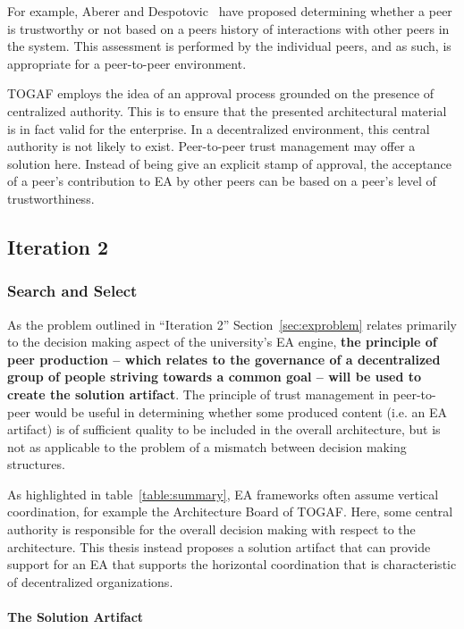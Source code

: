 For example, Aberer and Despotovic~\cite{aberer2001managing} have proposed determining whether a peer is trustworthy or not based on a peers history of interactions with other peers in the system. This assessment is performed by the individual peers, and as such, is appropriate for a peer-to-peer environment.

TOGAF employs the idea of an approval process grounded on the presence of centralized authority. This is to ensure that the presented architectural material is in fact valid for the enterprise. In a decentralized environment, this central authority is not likely to exist. Peer-to-peer trust management may offer a solution here. Instead of being give an explicit stamp of approval, the acceptance of a peer's contribution to EA by other peers can be based on a peer's level of trustworthiness. 

\subsection{Iteration 2}
\label{sec:design_iteration2}

\subsubsection*{Search and Select}

As the problem outlined in ``Iteration 2'' Section~\ref{sec:exproblem} relates primarily to the decision making aspect of the university's EA engine, \textbf{the principle of peer production -- which relates to the governance of a decentralized group of people striving towards a common goal -- will be used to create the solution artifact}.  The principle of trust management in peer-to-peer would be useful in determining whether some produced content (i.e. an EA artifact) is of sufficient quality to be included in the overall architecture, but is not as applicable to the problem of a mismatch between decision making structures. 

As highlighted in table~\ref{table:summary}, EA frameworks often assume vertical coordination, for example the Architecture Board of TOGAF. Here, some central authority is responsible for the overall decision making with respect to the architecture. This thesis instead proposes a solution artifact that can provide support for an EA that supports the horizontal coordination that is characteristic of decentralized organizations.

\paragraph*{The Solution Artifact}

